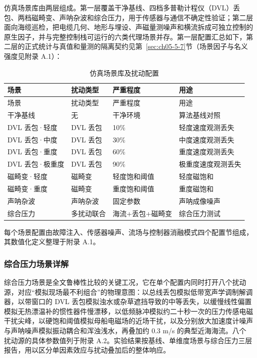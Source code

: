 仿真场景库由两层组成。第一层覆盖干净基线、四档多普勒计程仪（DVL）丢包、两档磁畸变、声呐杂波和综合压力，用于传感器与通信不确定性验证；第二层面向海缆巡检，把电缆几何、地形与埋设、声磁量测噪声和横流拆成可独立控制的原生因子，并与完整控制栈可运行的六类代理场景并存。第一层配置汇总如下，第二层的正式统计与真值和量测的隔离契约见第~\ref{sec:ch05-5-7}节（场景因子与名义强度见附录 A.1）：

\begin{longtable}[]{@{}llll@{}}
\caption{仿真场景库及扰动配置}\label{tab:ch05-scenarios}\tabularnewline
\toprule\noalign{}
场景 & 扰动类型 & 严重程度 & 用途 \\
\midrule\noalign{}
\endfirsthead
\toprule\noalign{}
场景 & 扰动类型 & 严重程度 & 用途 \\
\midrule\noalign{}
\endhead
\bottomrule\noalign{}
\endlastfoot
干净基线 & 无 & 干净环境 & 算法基线对照 \\
DVL 丢包·轻度 & DVL 丢包 & 10\% & 轻度速度观测丢失 \\
DVL 丢包·中度 & DVL 丢包 & 30\% & 中度速度观测丢失 \\
DVL 丢包·重度 & DVL 丢包 & 60\% & 重度速度观测丢失 \\
DVL 丢包·极重度 & DVL 丢包 & 90\% & 极重度速度观测丢失 \\
磁畸变·轻度 & 磁畸变 & 轻度饱和阈值 & 轻度磁饱和 \\
磁畸变·重度 & 磁畸变 & 重度饱和阈值 & 重度磁饱和 \\
声呐杂波 & 声呐杂波 & 固定参数 & 声呐成像噪声 \\
综合压力 & 多扰动联合 & 海流+丢包+磁畸变 & 综合压力测试 \\
\end{longtable}

每个场景配置由故障注入、传感器噪声、流场与控制器消融模式四个配置节组成，其数值化定义整理于附录 A.1。

\subsubsection{综合压力场景详解}\label{sec:ch05-5-2-2}

综合压力场景是全文鲁棒性比较的关键工况，它在单个配置内同时打开八个扰动源，对应``模拟现场最不利组合''的物理意图：以总线丢包模拟低带宽声学调制解调器，以带窗口的 DVL 丢包模拟浊水或杂草遮挡导致的中等丢失，以缓慢线性偏置模拟无热漂温补的惯性器件慢漂移，以低频脉冲模拟约二十秒一次的压力传感电磁干扰尖峰，以硬饱和阈值模拟母船电磁场的近场干扰，以及分别放大加速度计噪声与声呐噪声模拟振动耦合和浑浊浅水，再叠加约 0.3 m/s 的典型近海海流。八个扰动源的具体参数值列于附录 A.2。实验结果按基线、单维度场景与综合压力三层报告，用以区分单因素效应与扰动叠加后的整体响应。

